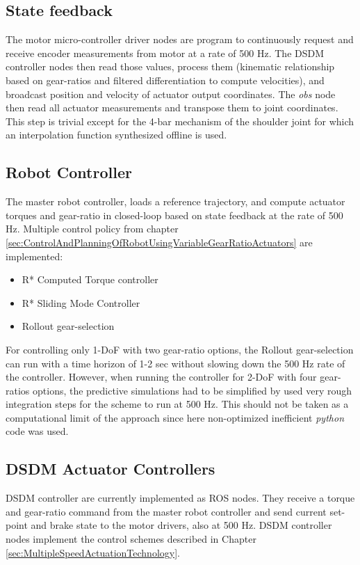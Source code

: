 \subsection{State feedback}

The motor micro-controller driver nodes are program to continuously request and receive encoder measurements from motor at a rate of 500 Hz. The DSDM controller nodes then read those values, process them (kinematic relationship based on gear-ratios and filtered differentiation to compute velocities), and broadcast position and velocity of actuator output coordinates. The \textit{obs} node then read all actuator measurements and transpose them to joint coordinates. This step is trivial except for the 4-bar mechanism of the shoulder joint for which an interpolation function synthesized offline is used. 

\subsection{Robot Controller}

The master robot controller, loads a reference trajectory, and compute actuator torques and gear-ratio in closed-loop based on state feedback at the rate of 500 Hz. Multiple control policy from chapter \ref{sec:ControlAndPlanningOfRobotUsingVariableGearRatioActuators} are implemented:
%
\begin{itemize}
	\item R* Computed Torque controller
	\item R* Sliding Mode Controller
	\item Rollout gear-selection
\end{itemize}
%
For controlling only 1-DoF with two gear-ratio options, the Rollout gear-selection can run with a time horizon of 1-2 sec without slowing down the 500 Hz rate of the controller. However, when running the controller for 2-DoF with four gear-ratios options, the predictive simulations had to be simplified by used very rough integration steps for the scheme to run at 500 Hz. This should not be taken as a computational limit of the approach since here non-optimized inefficient \textit{python} code was used.

\subsection{DSDM Actuator Controllers}

DSDM controller are currently implemented as ROS nodes. They receive a torque and gear-ratio command from the master robot controller and send current set-point and brake state to the motor drivers, also at 500 Hz. DSDM controller nodes implement the control schemes described in Chapter \ref{sec:MultipleSpeedActuationTechnology}.

